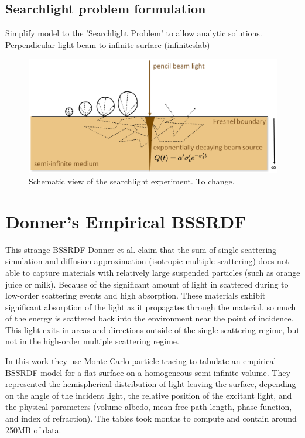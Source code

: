 \subsection{Searchlight problem formulation}
Simplify model to the 'Searchlight Problem' to allow analytic solutions.
Perpendicular light beam to infinite surface \cite{Jacques1995}
(\gls{infiniteslab}) \begin{figure}[h]
    \centering
    \includegraphics[width=\textwidth]{imgs/schemes/searchlight_disney}
    \caption{Schematic view of the searchlight experiment. To change.}
    \label{fig:searchlight_scheme}
\end{figure}


\section{Donner's Empirical BSSRDF}
This strange \gls{BSSRDF}
Donner et al. \cite{Donner:2009:EBM} claim that the sum of single scattering
simulation and diffusion approximation (isotropic multiple scattering) does not
able to capture materials with relatively large suspended particles (such as
orange juice or milk). Because of the significant amount of light in scattered
during to low-order scattering events and high absorption.
These materials exhibit significant absorption of the light as it propagates
through the material, so much of the energy is scattered back into
the environment near the point of incidence. This light exits in areas and
directions outside of the single scattering regime, but not in the high-order
multiple scattering regime.


In this work they use Monte Carlo particle tracing to tabulate an empirical
BSSRDF model for a flat surface on a homogeneous semi-infinite volume.
They represented the hemispherical distribution of light leaving the surface,
depending on the angle of the incident light, the relative position of the
excitant light, and the physical parameters (volume albedo, mean free path
length, phase function, and index of refraction). The tables took months to
compute and contain around 250MB of data.

